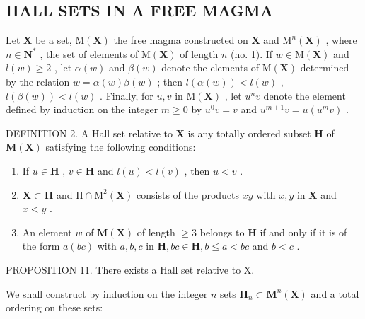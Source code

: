 \subsection{HALL SETS IN A FREE MAGMA}

Let \(\mathbf{X}\) be a set, \(\mathrm{M}(\mathbf{X})\) the free magma constructed on \(\mathbf{X}\) and \(\mathrm{M}^n (\mathbf{X})\) , where \(n\in \mathbf{N}^*\) , the set of elements of \(\mathrm{M}(\mathbf{X})\) of length \(n\) (no. 1). If \(w\in \mathrm{M}(\mathbf{X})\) and \(l(w)\geqslant 2\) , let \(\alpha (w)\) and \(\beta (w)\) denote the elements of \(\mathrm{M}(\mathbf{X})\) determined by the relation \(w = \alpha (w)\beta (w)\) ; then \(l(\alpha (w)) < l(w)\) , \(l(\beta (w)) < l(w)\) . Finally, for \(u,v\) in \(\mathrm{M}(\mathbf{X})\) , let \(u^n v\) denote the element defined by induction on the integer \(m\geqslant 0\) by \(u^{0}v = v\) and \(u^{m + 1}v = u(u^{m}v)\) .

DEFINITION 2. A Hall set relative to \(\mathbf{X}\) is any totally ordered subset \(\mathbf{H}\) of \(\mathbf{M}(\mathbf{X})\) satisfying the following conditions:

\begin{enumerate}
\def\labelenumi{(\Alph{enumi})}
\item
  If \(u \in \mathbf{H}\) , \(v \in \mathbf{H}\) and \(l(u) < l(v)\) , then \(u < v\) .
\item
  \(\mathbf{X} \subset \mathbf{H}\) and \(\mathrm{H} \cap \mathrm{M}^2(\mathbf{X})\) consists of the products \(xy\) with \(x, y\) in \(\mathbf{X}\) and \(x < y\) .
\item
  An element \(w\) of \(\mathbf{M}(\mathbf{X})\) of length \(\geqslant 3\) belongs to \(\mathbf{H}\) if and only if it is of the form \(a(bc)\) with \(a, b, c\) in \(\mathbf{H}, bc \in \mathbf{H}, b \leqslant a < bc\) and \(b < c\) .
\end{enumerate}

PROPOSITION 11. There exists a Hall set relative to X.

We shall construct by induction on the integer \(n\) sets \(\mathbf{H}_n \subset \mathbf{M}^n(\mathbf{X})\) and a total ordering on these sets:

